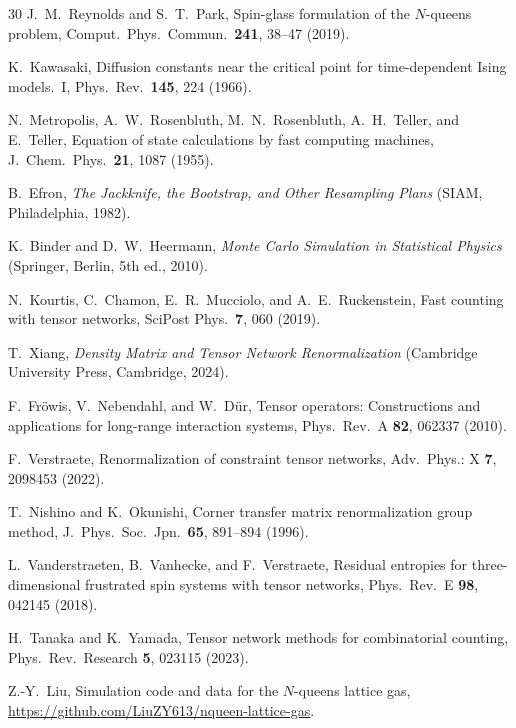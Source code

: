 \documentclass[aps, pre, reprint, amsmath, amssymb, superscriptaddress, floatfix]{revtex4-2}
\begin{document}
\begin{thebibliography}{30}
J.~M.~Reynolds and S.~T.~Park,
Spin-glass formulation of the $N$-queens problem,
Comput.\ Phys.\ Commun.\ \textbf{241}, 38--47 (2019).

K.~Kawasaki,
Diffusion constants near the critical point for time-dependent Ising
models.\ I,
Phys.\ Rev.\ \textbf{145}, 224 (1966).

N.~Metropolis, A.~W.~Rosenbluth, M.~N.~Rosenbluth, A.~H.~Teller,
and E.~Teller,
Equation of state calculations by fast computing machines,
J.~Chem.~Phys.\ \textbf{21}, 1087 (1955).

B.~Efron,
\textit{The Jackknife, the Bootstrap, and Other Resampling Plans}
(SIAM, Philadelphia, 1982).

K.~Binder and D.~W.~Heermann,
\textit{Monte Carlo Simulation in Statistical Physics}
(Springer, Berlin, 5th ed., 2010).

N.~Kourtis, C.~Chamon, E.~R.~Mucciolo, and A.~E.~Ruckenstein,
Fast counting with tensor networks,
SciPost Phys.\ \textbf{7}, 060 (2019).

T.~Xiang,
\textit{Density Matrix and Tensor Network Renormalization}
(Cambridge University Press, Cambridge, 2024).

F.~Fr\"owis, V.~Nebendahl, and W.~D\"ur,
Tensor operators: Constructions and applications for long-range
interaction systems,
Phys.\ Rev.\ A \textbf{82}, 062337 (2010).

F.~Verstraete,
Renormalization of constraint tensor networks,
Adv.\ Phys.: X \textbf{7}, 2098453 (2022).

T.~Nishino and K.~Okunishi,
Corner transfer matrix renormalization group method,
J.~Phys.\ Soc.\ Jpn.\ \textbf{65}, 891--894 (1996).

L.~Vanderstraeten, B.~Vanhecke, and F.~Verstraete,
Residual entropies for three-dimensional frustrated spin systems with
tensor networks,
Phys.\ Rev.\ E \textbf{98}, 042145 (2018).

H.~Tanaka and K.~Yamada,
Tensor network methods for combinatorial counting,
Phys.\ Rev.\ Research \textbf{5}, 023115 (2023).

Z.-Y.~Liu,
Simulation code and data for the $N$-queens lattice gas,
\url{https://github.com/LiuZY613/nqueen-lattice-gas}.

\end{thebibliography}
\end{document}
